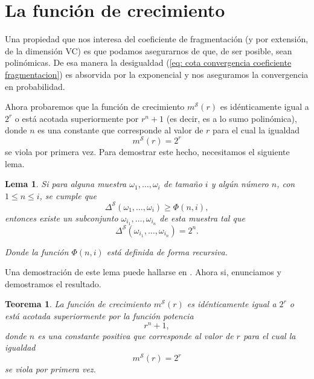 \documentclass{report}
\newtheorem{thm}{Teorema}[section]
\newtheorem{lem}{Lema}[section]
\begin{document}
\section{La función de crecimiento}

Una propiedad que nos interesa del coeficiente de fragmentación (y por extensión, de la dimensión VC) es que podamos asegurarnos
de que, de ser posible, sean polinómicas. De esa manera la desigualdad (\ref{eq: cota convergencia coeficiente fragmentacion})
es absorvida por la exponencial y nos aseguramos la convergencia en probabilidad.

Ahora probaremos que la función de crecimiento $m^{\mathcal{S}}(r)$
es idénticamente igual a \( 2^r \) o está acotada superiormente por \( r^n + 1 \) (es decir, es a lo sumo polinómica),
donde \( n \) es una constante que corresponde al valor de \( r \) para el cual la igualdad
\[
m^{\mathcal{S}}(r) = 2^r
\]
se viola por primera vez. Para demostrar este hecho, necesitamos el siguiente lema.

\begin{lem}\label{Lema 1}
Si para alguna muestra  \( \omega_1, \ldots, \omega_i \) de tamaño $i$ y algún número \( n \), con \( 1 \leq n \leq i \),
se cumple que
\[
\Delta^{\mathcal{S}}(\omega_1, \ldots, \omega_i) \geq \Phi(n, i),
\]
entonces existe un subconjunto \( \omega_{i_1}, \dots, \omega_{i_n} \) de esta muestra tal que
\[
\Delta^{\mathcal{S}}(\omega_{i_1}, \dots,\omega_{i_n}) = 2^n.
\]

Donde la función \( \Phi(n, i) \) está definida de forma recursiva.
\end{lem}

Una demostración de este lema puede hallarse en \cite{vapnik1971}.
Ahora si, enunciamos y demostramos el resultado.

\begin{thm} \label{teo: cota polinomica de la función de crecimiento}
    La función de crecimiento \( m^{\mathcal{S}}(r) \) es idénticamente igual a \( 2^r \) o está acotada superiormente por la función potencia
    \[
    r^n + 1,
    \]
    donde \( n \) es una constante positiva que corresponde al valor de \( r \) para el cual la igualdad
    \[
    m^{\mathcal{S}}(r) = 2^r
    \]
    se viola por primera vez.
\end{thm}
\end{document}
